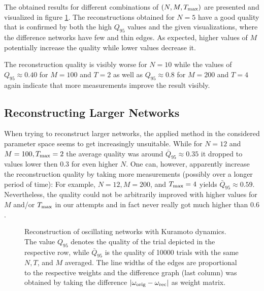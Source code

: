\documentclass{scrartcl}
\begin{document}
The obtained results for different combinations of $(N, M, T_{\mathrm{max}})$ are
presented and visualized in figure \ref{fig:D211}. The reconstructions
obtained for $N = 5$ have a good quality that is confirmed by both the high
$Q_{95}$ values and the given visualizations, where the difference networks
have few and thin edges. As expected, higher values of $M$ potentially
increase the quality while lower values decrease it.

The reconstruction quality is visibly worse for $N = 10$ while the values
of $Q_{95} \approx 0.40$ for $M = 100$ and $T = 2$ as well as
$Q_{95}\approx 0.8$ for $M = 200$ and $T = 4$ again indicate that more
measurements improve the result visibly.


\subsection{Reconstructing Larger Networks}
When trying to reconstruct larger networks, the applied method in the
considered parameter space seems to get increasingly unsuitable. While for
$N=12$ and  $M = 100, T_{\mathrm{max}} = 2$ the average quality was around
$\bar{Q}_{95}\approx 0.35$ it dropped to values lower then $0.3$ for even
higher $N$. One can, however, apparently increase the reconstruction
quality by taking more measurements (possibly over a longer period of
time): For example, $N=12, M=200$, and $T_{\mathrm{max}}=4$ yields
$\bar{Q}_{95}\approx 0.59$. Nevertheless, the quality could not be
arbitrarily improved with higher values for $M$ and/or $T_{\mathrm{max}}$ in our
attempts and in fact never really got much higher than $0.6$.  



\begin{figure}
    \centering
    \def\svgwidth{0.75\textwidth}
    
    \caption{Reconstruction of oscillating networks with Kuramoto dynamics. The
        value $Q_{95}$ denotes the quality of the trial depicted in the
        respective row, while $\bar{Q}_{95}$ is the quality of 10000
        trials with the same $N, T$, and $M$ averaged. The line widths of
        the edges are proportional to the respective weights and the
        difference graph (last column) was obtained by taking the
        difference $|\omega_{\mathrm{orig}} - \omega_{\mathrm{rec}}|$ as weight matrix.}
    \label{fig:D211}
\end{figure}
\end{document}
